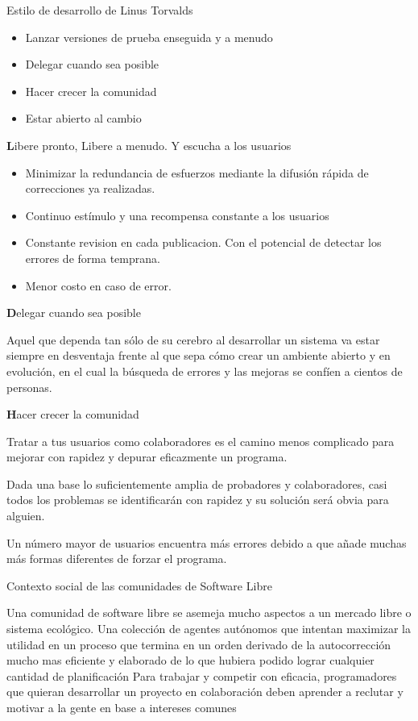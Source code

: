 Estilo de desarrollo de Linus Torvalds     
\begin{itemize}
     \item Lanzar versiones de prueba enseguida y a menudo
     \item Delegar cuando sea posible
     \item Hacer crecer la comunidad
     \item Estar abierto al cambio
\end{itemize}

\textbf Libere pronto, Libere a menudo. Y escucha a los usuarios
\begin{itemize}
\item Minimizar la redundancia de esfuerzos mediante la difusión rápida de correcciones ya realizadas.
\item Continuo estímulo y una recompensa constante a los usuarios 
\item Constante revision en cada publicacion. Con el potencial de detectar los errores de forma temprana.
\item Menor costo en caso de error.
\end{itemize}

\textbf Delegar cuando sea posible

Aquel que dependa tan sólo de su cerebro al desarrollar un sistema va estar siempre en desventaja frente al que sepa cómo crear un ambiente abierto y en evolución, en el cual la búsqueda de errores y las mejoras se confíen a cientos de personas.  

\textbf Hacer crecer la comunidad

Tratar a tus usuarios como colaboradores es el camino menos complicado para mejorar con rapidez y depurar eficazmente un programa.

Dada una base lo suficientemente amplia de probadores y colaboradores, casi todos los problemas se identificarán con rapidez y su solución será obvia para alguien.  

Un número mayor de usuarios encuentra más errores debido a que añade muchas más formas diferentes de forzar el programa.


Contexto social de las comunidades de Software Libre 

Una comunidad de software libre se asemeja mucho aspectos a un mercado libre o sistema ecológico.
Una colección de agentes autónomos que intentan maximizar la utilidad en un proceso que termina en un orden derivado de la autocorrección mucho mas eficiente y elaborado de lo que hubiera podido lograr cualquier cantidad de planificación
Para trabajar y competir con eficacia, programadores que quieran desarrollar un proyecto en colaboración deben aprender a reclutar y motivar a la gente en base a intereses comunes

